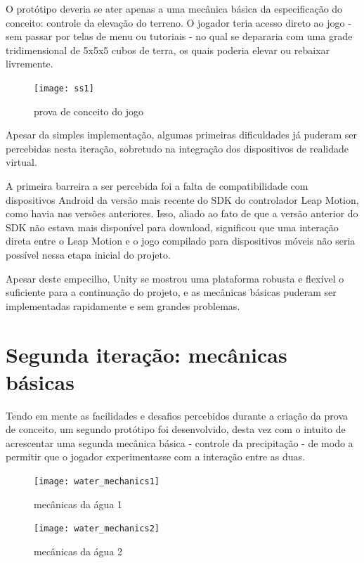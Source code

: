 O protótipo deveria se ater apenas a uma mecânica básica da especificação do conceito: controle da elevação do terreno. O jogador teria acesso direto ao jogo - sem passar por telas de menu ou tutoriais - no qual se depararia com uma grade tridimensional de 5x5x5 cubos de terra, os quais poderia elevar ou rebaixar livremente.

\begin{figure}[h]
	\centering
	\texttt{[image: ss1]}
	\caption{prova de conceito do jogo}
\end{figure}

Apesar da simples implementação, algumas  primeiras dificuldades já puderam ser percebidas nesta iteração, sobretudo na integração dos dispositivos de realidade virtual.

A primeira barreira a ser percebida foi a falta de compatibilidade com dispositivos Android da versão mais recente do SDK do controlador Leap Motion, como havia nas versões anteriores. Isso, aliado ao fato de que a versão anterior do SDK não estava mais disponível para download, significou que uma interação direta entre o Leap Motion e o jogo compilado para dispositivos móveis não seria possível nessa etapa inicial do projeto.

Apesar deste empecilho, Unity se mostrou uma plataforma robusta e flexível o suficiente para a continuação do projeto, e as mecânicas básicas puderam ser implementadas rapidamente e sem grandes problemas.

\section{Segunda iteração: mecânicas básicas}\label{sec-segunda-iteracao-mecanicas-basicas}

Tendo em mente as facilidades e desafios percebidos durante a criação da prova de conceito, um segundo protótipo foi desenvolvido, desta vez com o intuito de acrescentar uma segunda mecânica básica - controle da precipitação - de modo a permitir que o jogador experimentasse com a interação entre as duas.

\begin{figure}[h]
	\centering
	\texttt{[image: water\_mechanics1]}
	\caption{mecânicas da água 1}
\end{figure}

\begin{figure}[h]
	\centering
	\texttt{[image: water\_mechanics2]}
	\caption{mecânicas da água 2}
\end{figure}

